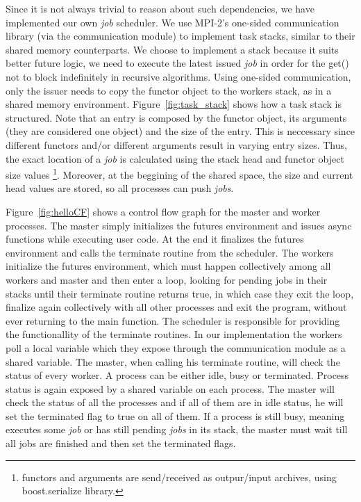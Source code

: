Since it is not always trivial to reason about such dependencies, we have implemented our own \emph{job} 
scheduler.  We use MPI-2's one-sided communication library (via the communication module) to implement task
stacks, similar to their shared memory counterparts. We choose to implement a stack because it suits better
future logic, we need to execute the latest issued \emph{job} in order for the get() not to block indefinitely
in recursive algorithms.  Using one-sided communication, only the issuer needs to copy the functor object to
the workers stack, as in a shared memory environment.  Figure~\ref{fig:task_stack} 
shows how a task stack is structured.  
Note that an entry is composed by the functor object, its arguments (they are considered one object) and the 
size of the entry. This is neccessary since different functors and/or different arguments result in 
varying entry sizes.
Thus, the exact location of a \emph{job} is calculated using the stack head and functor object size values 
\footnote{functors and arguments are send/received as outpur/input archives, using boost.serialize library.}.
Moreover, at the beggining of the shared space, the size and current head values are stored, so all processes
can push \emph{jobs}.


Figure~\ref{fig:helloCF} shows a control flow graph for the master and worker processes.  
The master simply initializes
the futures environment and issues async functions while executing user code.  At the end it finalizes 
the futures environment and calls the terminate routine from the scheduler.  The workers initialize 
the futures environment, which must happen collectively among all workers and master and then enter a
loop, looking for pending jobs in their stacks until their terminate routine returns true, in which case
they exit the loop, finalize again collectively with all other processes and exit the program, without ever
returning to the main function.  The scheduler is responsible for providing the functionallity of the terminate
routines.  In our implementation the workers poll a local variable which they expose through the communication
module as a shared variable.  The master, when calling his terminate routine, will check the status of every 
worker.  A process can be either idle, busy or terminated.  Process status is again exposed by a shared variable
on each process.  The master will check the status of all the processes and if all of them are in idle status, he
will set the terminated flag to true on all of them.  If a process is still busy, meaning executes some \emph{job}
or has still pending \emph{jobs} in its stack, the master must wait till all jobs are finished and then set the 
terminated flags.

